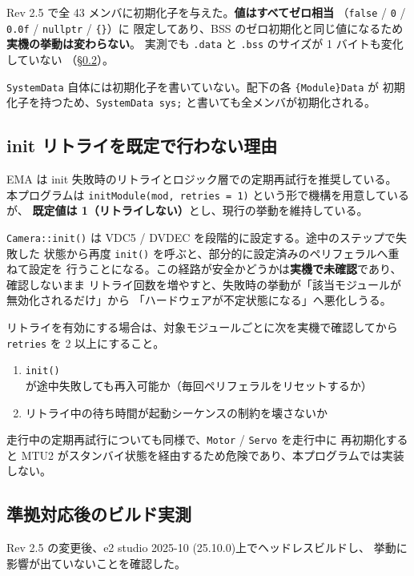 \documentclass[a4paper,11pt,dvipdfmx]{jsarticle}
\newcommand{\ideversion}{2025-10 (25.10.0)}
\begin{document}
Rev 2.5 で全 43 メンバに初期化子を与えた。\textbf{値はすべてゼロ相当}
（\texttt{false} / \texttt{0} / \texttt{0.0f} / \texttt{nullptr} / \texttt{\{\}}）に
限定してあり、BSS のゼロ初期化と同じ値になるため\textbf{実機の挙動は変わらない}。
実測でも \texttt{.data} と \texttt{.bss} のサイズが 1 バイトも変化していない
（\hyperref[sec:emabuild]{§\ref*{sec:emabuild}}）。

\texttt{SystemData} 自体には初期化子を書いていない。配下の各 \texttt{\{Module\}Data} が
初期化子を持つため、\texttt{SystemData sys;} と書いても全メンバが初期化される。

\subsection{init リトライを既定で行わない理由}\label{sec:emaretry}

EMA は init 失敗時のリトライとロジック層での定期再試行を推奨している。
本プログラムは \texttt{initModule(mod, retries = 1)} という形で機構を用意しているが、
\textbf{既定値は 1（リトライしない）}とし、現行の挙動を維持している。

\texttt{Camera::init()} は VDC5 / DVDEC を段階的に設定する。途中のステップで失敗した
状態から再度 \texttt{init()} を呼ぶと、部分的に設定済みのペリフェラルへ重ねて設定を
行うことになる。この経路が安全かどうかは\textbf{実機で未確認}であり、確認しないまま
リトライ回数を増やすと、失敗時の挙動が「該当モジュールが無効化されるだけ」から
「ハードウェアが不定状態になる」へ悪化しうる。

リトライを有効にする場合は、対象モジュールごとに次を実機で確認してから
\texttt{retries} を 2 以上にすること。

\begin{enumerate}[nosep]
  \item \texttt{init()} が途中失敗しても再入可能か（毎回ペリフェラルをリセットするか）
  \item リトライ中の待ち時間が起動シーケンスの制約を壊さないか
\end{enumerate}

走行中の定期再試行についても同様で、\texttt{Motor} / \texttt{Servo} を走行中に
再初期化すると MTU2 がスタンバイ状態を経由するため危険であり、本プログラムでは実装しない。

\subsection{準拠対応後のビルド実測}\label{sec:emabuild}

Rev 2.5 の変更後、e2 studio \ideversion 上でヘッドレスビルドし、
挙動に影響が出ていないことを確認した。
\end{document}
